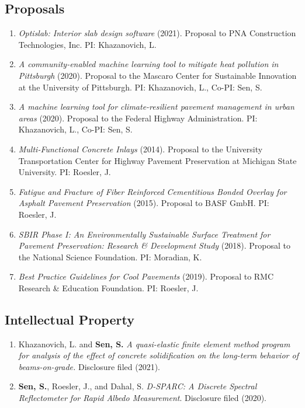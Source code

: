\documentclass[12pt]{article}
\begin{document}
\subsection*{Proposals}
\begin{enumerate}[label=(P\arabic*)]
	\item \textit{Optislab: Interior slab design software} (2021). Proposal to PNA Construction Technologies, Inc. PI: Khazanovich, L.
	\item \textit{A community-enabled machine learning tool to mitigate heat pollution in Pittsburgh} (2020). Proposal to the Mascaro Center for Sustainable Innovation at the University of Pittsburgh. PI: Khazanovich, L., Co-PI: Sen, S.
	\item \textit{A machine learning tool for climate-resilient pavement management in urban areas} (2020). Proposal to the Federal Highway Administration. PI: Khazanovich, L., Co-PI: Sen, S.  
	\item \textit{Multi-Functional Concrete Inlays} (2014). Proposal to the University Transportation Center for Highway Pavement Preservation at Michigan State University. PI: Roesler, J. 
	\item \textit{Fatigue and Fracture of Fiber Reinforced Cementitious Bonded Overlay for Asphalt Pavement Preservation} (2015). Proposal to BASF GmbH. PI: Roesler, J. 
	\item \textit{SBIR Phase I: An Environmentally Sustainable Surface Treatment for Pavement Preservation: Research \& Development Study} (2018). Proposal to the National Science Foundation. PI: Moradian, K.
	\item \textit{Best Practice Guidelines for Cool Pavements} (2019). Proposal to RMC Research \& Education Foundation. PI: Roesler, J.
\end{enumerate}

\subsection*{Intellectual Property}
\begin{enumerate}[label=(IP\arabic*)]
	\item Khazanovich, L. and \textbf{Sen, S.} \textit{A quasi-elastic finite element method program for analysis of the effect of concrete solidification on the long-term behavior of beams-on-grade.} Disclosure filed (2021).
	\item \textbf{Sen, S.}, Roesler, J., and Dahal, S. \textit{D-SPARC: A Discrete Spectral Reflectometer for Rapid Albedo Measurement}. Disclosure filed (2020). 
\end{enumerate} 
\end{document}
